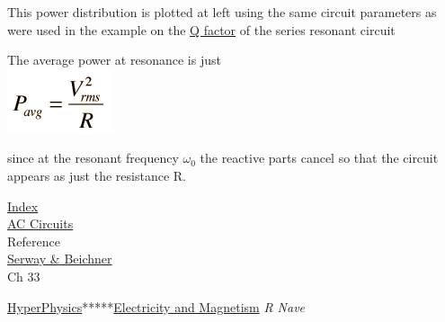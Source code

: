 This power distribution is plotted at left using the same circuit
parameters as were used in the example on the
\href{http://hyperphysics.phy-astr.gsu.edu/hbase/electric/serres.html\#c3}{Q
factor} of the series resonant circuit

The average power at resonance is just\\

\includegraphics{./resonant-rlc-circuits_files/pser5.png}

since at the resonant frequency $\omega_0$ the reactive parts
cancel so that the circuit appears as just the resistance R.\strut

\href{http://hyperphysics.phy-astr.gsu.edu/hbase/hframe.html}{Index}\\[2\baselineskip]\href{http://hyperphysics.phy-astr.gsu.edu/hbase/electric/accircon.html\#c1}{AC
Circuits}\\[2\baselineskip]Reference\\
\href{http://hyperphysics.phy-astr.gsu.edu/hbase/electric/eleref.html\#c1}{Serway
\& Beichner}\\
Ch 33\strut

\href{http://hyperphysics.phy-astr.gsu.edu/hbase/hph.html}{HyperPhysics}*****\href{http://hyperphysics.phy-astr.gsu.edu/hbase/emcon.html\#emcon}{Electricity
and Magnetism} \emph{R Nave}

